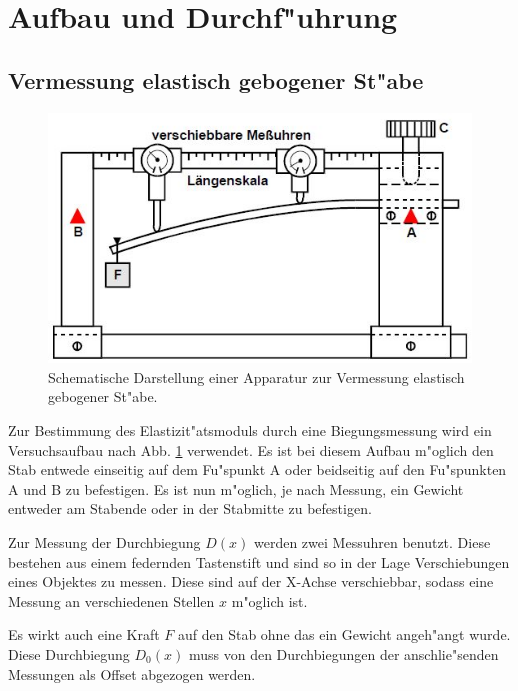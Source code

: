 \section{Aufbau und Durchf"uhrung}
	\label{sec:durchfuehrung}

	\subsection{Vermessung elastisch gebogener St"abe} %
	\label{sub:beschreibung_einer_apparatur_zur_vermessung_elastische_gebogener_st_abe}
	
		\begin{figure}[!h]
			\centering
			\includegraphics[width = 13cm]{img/messung1.JPG}
			\caption{Schematische Darstellung einer Apparatur zur Vermessung elastisch gebogener St"abe. \cite{anleitung}}
			\label{fg:messung1}
		\end{figure}

		Zur Bestimmung des Elastizit"atsmoduls durch eine Biegungsmessung wird ein Versuchsaufbau nach Abb. \ref{fg:messung1} verwendet. Es ist bei diesem Aufbau m"oglich den Stab entwede einseitig auf dem Fu"spunkt A oder beidseitig auf den Fu"spunkten A und B zu befestigen. Es ist nun m"oglich, je nach Messung, ein Gewicht entweder am Stabende oder in der Stabmitte zu befestigen.

		Zur Messung der Durchbiegung $D(x)$ werden zwei Messuhren benutzt. Diese bestehen aus einem federnden Tastenstift und sind so in der Lage Verschiebungen eines Objektes zu messen. Diese sind auf der X-Achse verschiebbar, sodass eine Messung an verschiedenen Stellen $x$ m"oglich ist.

		Es wirkt auch eine Kraft $F$ auf den Stab ohne das ein Gewicht angeh"angt wurde. Diese Durchbiegung $D_\mathrm{0}(x)$ muss von den Durchbiegungen der anschlie"senden Messungen als Offset abgezogen werden.

